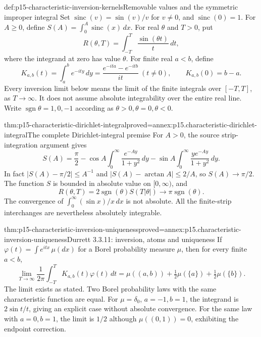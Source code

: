 \begin{hbdefinition}{def:p15-characteristic-inversion-kernels}{Removable values and the symmetric improper integral}
Set \(\operatorname{sinc}(v)=\sin(v)/v\) for \(v\ne0\),
and \(\operatorname{sinc}(0)=1\).
For \(A\geq0\), define
\(S(A)=\int_0^A\operatorname{sinc}(x)\,dx\).
For real \(\theta\) and \(T>0\), put
\[
 R(\theta,T)=\int_{-T}^T\frac{\sin(\theta t)}t\,dt,
\]
where the integrand at zero has value \(\theta\).
For finite real \(a<b\), define
\[
 K_{a,b}(t)=\int_a^b e^{-ity}\,dy
 =\frac{e^{-ita}-e^{-itb}}{it}\ (t\ne0),\qquad
 K_{a,b}(0)=b-a.
\]
Every inversion limit below means the limit of the finite
integrals over \([-T,T]\), as \(T\to\infty\). It does not
assume absolute integrability over the entire real line.
Write \(\operatorname{sgn}\theta=1,0,-1\) according as
\(\theta>0,\theta=0,\theta<0\).
\end{hbdefinition}

\begin{hblemma}{thm:p15-characteristic-dirichlet-integral}{proved=annex:p15.characteristic-dirichlet-integral}{The complete Dirichlet-integral premise}
For \(A>0\), the source strip-integration argument gives
\[
 S(A)=\frac\pi2-\cos A\int_0^\infty\frac{e^{-Ay}}{1+y^2}\,dy
                -\sin A\int_0^\infty\frac{y e^{-Ay}}{1+y^2}\,dy.
\]
In fact \(|S(A)-\pi/2|\leq A^{-1}\) and
\(|S(A)-\arctan A|\leq2/A\), so \(S(A)\to\pi/2\).
The function \(S\) is bounded in absolute value on \([0,\infty)\),
and
\[
 R(\theta,T)=2\operatorname{sgn}(\theta)S(T|\theta|)
           \longrightarrow\pi\operatorname{sgn}(\theta).
\]
The convergence of \(\int_0^\infty(\sin x)/x\,dx\) is not
absolute. All the finite-strip interchanges are nevertheless
absolutely integrable.
\end{hblemma}

\begin{hbtheorem}{thm:p15-characteristic-inversion-uniqueness}{proved=annex:p15.characteristic-inversion-uniqueness}{Durrett 3.3.11: inversion, atoms and uniqueness}
If \(\varphi(t)=\int e^{itx}\,\mu(dx)\) for a Borel probability
measure \(\mu\), then for every finite \(a<b\),
\[
 \lim_{T\to\infty}\frac1{2\pi}\int_{-T}^T
                       K_{a,b}(t)\varphi(t)\,dt
 =\mu((a,b))+\tfrac12\mu(\{a\})+\tfrac12\mu(\{b\}).
\]
The limit exists as stated. Two Borel probability laws with
the same characteristic function are equal.
For \(\mu=\delta_0\), \(a=-1,b=1\), the integrand is
\(2\sin t/t\), giving an explicit case without absolute
convergence.
For the same law with \(a=0,b=1\), the limit is \(1/2\)
although \(\mu((0,1))=0\), exhibiting the endpoint correction.
\end{hbtheorem}


